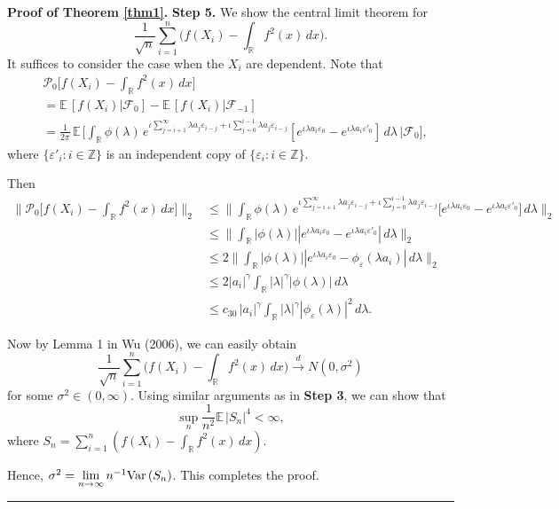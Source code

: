 \documentclass[11pt]{article}
\newenvironment{proof}[1][Proof]{\textbf{#1.} }{\
\rule{0.5em}{0.5em}}
\def\R{{\mathbb R}}
\def\E{{{\mathbb E}\,}}
\def\Z{{\mathbb Z}}
\def\Var{{\mathop {{\rm Var\, }}}}
\begin{document}
\begin{proof}[Proof of Theorem \ref{thm1}]
\medskip \noindent
\textbf{Step 5.}  We show the central limit theorem for
\[
\frac{1}{\sqrt{n}} \sum^n_{i=1}\Big(f(X_i)-\int_{\R} f^2(x)\, dx\Big).
\]
It suffices to consider the case when the $X_i$ are dependent. Note that 
\begin{align*}
&\mathcal{P}_{0}\big[f(X_i)-\int_{\R} f^2(x)\, dx\big]\\
&=\E [f(X_i)|\mathcal{F}_0]-\E [f(X_i)|\mathcal{F}_{-1}] \\
&=\frac{1}{2\pi}\, \E\bigg[\int_{\R} \phi(\lambda) \, e^{\iota\sum\limits_{j=i+1}^{\infty} \lambda a_j \varepsilon_{i-j}+\iota\sum\limits_{j=0}^{i-1}  \lambda a_j \varepsilon_{i-j}}\left[e^{\iota  \lambda a_i \varepsilon_0}-e^{\iota \lambda a_i  \varepsilon'_0}\right]\, d\lambda \, \bigg|\mathcal{F}_0\bigg], 
\end{align*}
where $\{\varepsilon'_i: i\in\Z\}$ is an independent copy of $\{\varepsilon_i: i\in\Z\}$.

Then
\begin{align*}
\Big\|\mathcal{P}_{0}\big[f(X_i)-\int_{\R} f^2(x)\, dx\big]\Big\|_2
&\leq \Big\|\int_{\R} \phi(\lambda) \, e^{\iota \sum\limits_{j=i+1}^{\infty} \lambda a_j \varepsilon_{i-j}+\iota \sum\limits_{j=0}^{i-1} \lambda a_j \varepsilon_{i-j}}\big[e^{\iota  \lambda a_i \varepsilon_0}-e^{\iota \lambda a_i \varepsilon'_0}\big]\, d\lambda\Big\|_2\\
&\leq \Big\|\int_{\R} |\phi(\lambda)| |e^{\iota  \lambda a_i \varepsilon_0}-e^{\iota \lambda a_i \varepsilon'_0}|\, d\lambda\Big\|_2\\
&\leq 2\Big\|\int_{\R} |\phi(\lambda)| |e^{\iota  \lambda a_i \varepsilon_0}-\phi_\varepsilon(\lambda a_i)|\, d\lambda\Big\|_2\\
&\leq 2|a_i|^{\gamma} \int_{\R} |\lambda|^{\gamma} |\phi(\lambda)|\, d\lambda\\
&\leq c_{30} \, |a_i|^{\gamma}\int_{\R} |\lambda|^{\gamma} |\phi_{\varepsilon}(\lambda)|^2\, d\lambda.
\end{align*}

Now by Lemma 1 in Wu (2006), we can easily obtain
\[
\frac{1}{\sqrt{n}} \sum^n_{i=1}\Big(f(X_i)-\int_{\R} f^2(x)\, dx\Big)\overset{d}{\longrightarrow} N(0,\sigma^2)
\]
for some $\sigma^2\in(0,\infty)$. Using similar arguments as in \textbf{Step 3}, we can show that 
\[
\sup_{n}\frac{1}{n^2}\E|S_n|^4<\infty,
\] 
where $S_n=\sum\limits^n_{i=1}\left(f(X_i)-\int_{\R} f^2(x)\, dx\right)$.

Hence, $\sigma^2=\lim\limits_{n\to\infty} n^{-1}\Var(S_n)$. This completes the proof.
\end{proof}
\end{document}
